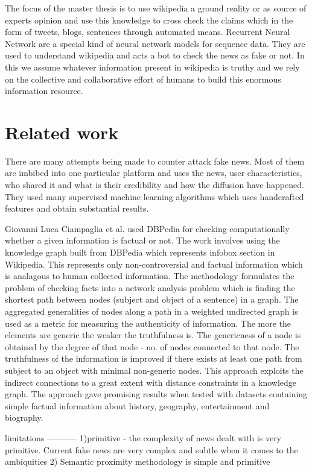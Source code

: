 \documentclass[a4paper, 11pt]{article}
\begin{document}
The focus of the master thesis is to use wikipedia a ground reality or as source of experts opinion and use this knowledge to cross check the claims which in the form of tweets, blogs, sentences through automated means. Recurrent Neural Network are a special kind of neural network models for sequence data. They are used to understand wikipedia and acts a bot to check the news as fake or not. In this we assume whatever information present in wikipedia is truthy and we rely on the collective and collaborative effort of humans to build this enormous information resource.
\section{Related work}

There are many attempts being made to counter attack fake news. Most of them are imbibed into one particular platform and uses the news, user characteristics, who shared it and what is their credibility and how the diffusion have happened. They used many supervised machine learning algorithms which uses handcrafted features and obtain substantial results. 

Giovanni Luca Ciampaglia et al. used DBPedia for checking computationally whether a given information is factual or not. The work involves using the knowledge graph built from DBPedia which represents infobox section in Wikipedia. This represents only non-controversial and factual information which is analagous to human collected information. The methodology formulates the problem of checking facts into a network analysis problem which is finding the shortest path between nodes (subject and object of a sentence) in a graph. The aggregated generalities of nodes along a path in a weighted undirected graph is used as a metric for measuring the authenticity of information. The more the elements are generic the weaker the truthfulness is.  The genericness of a node is obtained by the degree of that node - no. of nodes connected to that node. The truthfulness of the information is improved if there exists at least one path from subject to an object with minimal non-generic nodes. This approach exploits the indirect connections to a great extent with distance constraints in a knowledge graph. The approach gave promising results when tested with datasets containing simple factual information about history, geography, entertainment and biography. 

limitations
-----------
1)primitive - the complexity of news dealt with is very primitive. Current fake news are very complex and subtle when it comes to the ambiquities
2) Semantic proximity methodology is simple and primitive
\end{document}
